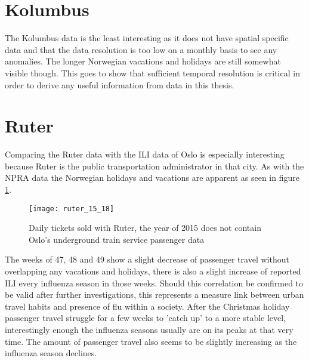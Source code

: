 \section{Kolumbus}
The Kolumbus data is the least interesting as it does not have spatial specific data and that the data resolution is too low on a monthly basis to see any anomalies. The longer Norwegian vacations and holidays are still somewhat visible though. This goes to show that sufficient temporal resolution is critical in order to derive any useful information from data in this thesis.




\section{Ruter}
Comparing the Ruter data with the ILI data of Oslo is especially interesting because Ruter is the public transportation administrator in that city. As with the NPRA data the Norwegian holidays and vacations are apparent as seen in figure \ref{fig:ruter_15_18}.

\begin{figure}[!htb]
\texttt{[image: ruter\_15\_18]}
\centering
\caption{Daily tickets sold with Ruter, the year of 2015 does not contain Oslo's underground train service passenger data}
\label{fig:ruter_15_18}
\end{figure}

The weeks of 47, 48 and 49 show a slight decrease of passenger travel without overlapping any vacations and holidays, there is also a slight increase of reported ILI every influenza season in those weeks. Should this correlation be confirmed to be valid after further investigations, this represents a measure link between urban travel habits and presence of flu within a society.
After the Christmas holiday passenger travel struggle for a few weeks to 'catch up' to a more stable level, interestingly enough the influenza seasons usually are on its peaks at that very time.
The amount of passenger travel also seems to be slightly increasing as the influenza season declines.














